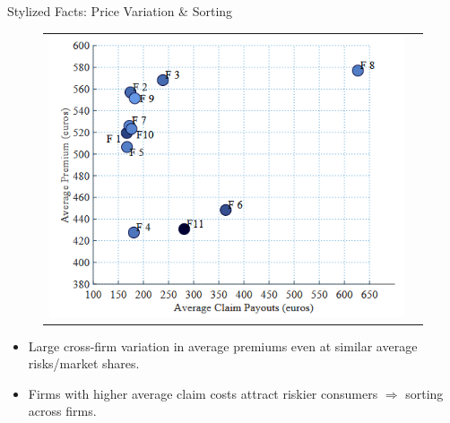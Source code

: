 \documentclass[10pt,aspectratio=169]{beamer}
\begin{document}
\begin{frame}{Stylized Facts: Price Variation \& Sorting}
\begin{figure}[H]
\centering{}%
\begin{tabular}{cc}
\includegraphics[scale=0.47]{Figures/Fig1.png}
\end{tabular}
\end{figure}
\vspace{0.75em}
\begin{itemize}
  \item Large cross-firm variation in average premiums even at similar average risks/market shares.
  \item Firms with higher average claim costs attract riskier consumers $\Rightarrow$ sorting across firms.
\end{itemize}
\end{frame}
\end{document}
